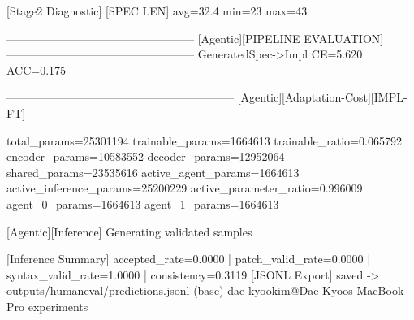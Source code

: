 [Stage2 Diagnostic]
[SPEC LEN] avg=32.4 min=23 max=43

--------------------------------------------------
[Agentic][PIPELINE EVALUATION]
--------------------------------------------------
GeneratedSpec->Impl  CE=5.620 ACC=0.175

------------------------------------------------------------
[Agentic][Adaptation-Cost][IMPL-FT]
------------------------------------------------------------

total_params=25301194
trainable_params=1664613
trainable_ratio=0.065792
encoder_params=10583552
decoder_params=12952064
shared_params=23535616
active_agent_params=1664613
active_inference_params=25200229
active_parameter_ratio=0.996009
agent_0_params=1664613
agent_1_params=1664613

[Agentic][Inference] Generating validated samples

[Inference Summary] accepted_rate=0.0000 | patch_valid_rate=0.0000 | syntax_valid_rate=1.0000 | consistency=0.3119
[JSONL Export] saved -> outputs/humaneval/predictions.jsonl
(base) dae-kyookim@Dae-Kyoos-MacBook-Pro experiments %